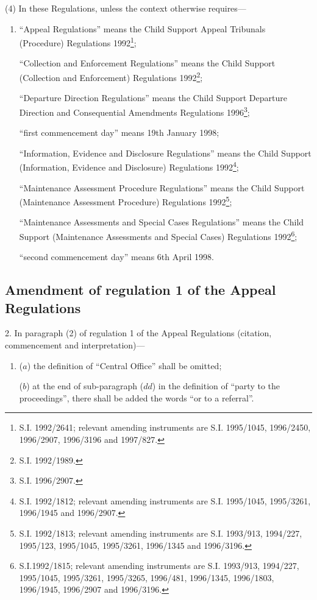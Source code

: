 \documentclass[12pt,a4paper]{article}
\begin{document}
(4) In these Regulations, unless the context otherwise requires—
\begin{enumerate}\item[]
“Appeal Regulations” means the Child Support Appeal Tribunals (Procedure) Regulations 1992\footnote{\frenchspacing S.I. 1992/2641; relevant amending instruments are S.I. 1995/1045, 1996/2450, 1996/2907, 1996/3196 and 1997/827.};

“Collection and Enforcement Regulations” means the Child Support (Collection and Enforcement) Regulations 1992\footnote{\frenchspacing S.I. 1992/1989.};

“Departure Direction Regulations” means the Child Support Departure Direction and Consequential Amendments Regulations 1996\footnote{\frenchspacing S.I. 1996/2907.};

“first commencement day” means 19th January 1998;

“Information, Evidence and Disclosure Regulations” means the Child Support (Information, Evidence and Disclosure) Regulations 1992\footnote{\frenchspacing S.I. 1992/1812; relevant amending instruments are S.I. 1995/1045, 1995/3261, 1996/1945 and 1996/2907.};

“Maintenance Assessment Procedure Regulations” means the Child Support (Maintenance Assessment Procedure) Regulations 1992\footnote{\frenchspacing S.I. 1992/1813; relevant amending instruments are S.I. 1993/913, 1994/227, 1995/123, 1995/1045, 1995/3261, 1996/1345 and 1996/3196.};

“Maintenance Assessments and Special Cases Regulations” means the Child Support (Maintenance Assessments and Special Cases) Regulations 1992\footnote{\frenchspacing S.I.1992/1815; relevant amending instruments are S.I. 1993/913, 1994/227, 1995/1045, 1995/3261, 1995/3265, 1996/481, 1996/1345, 1996/1803, 1996/1945, 1996/2907 and 1996/3196.};

“second commencement day” means 6th April 1998.
\end{enumerate}

\subsection[2. Amendment of regulation 1 of the Appeal Regulations]{Amendment of regulation 1 of the Appeal Regulations}

2.  In paragraph (2) of regulation 1 of the Appeal Regulations (citation, commencement and interpretation)—
\begin{enumerate}\item[]
($a$) the definition of “Central Office” shall be omitted;

($b$) at the end of sub-paragraph ($dd$) in the definition of “party to the proceedings”, there shall be added the words “or to a referral”.
\end{enumerate}
\end{document}
